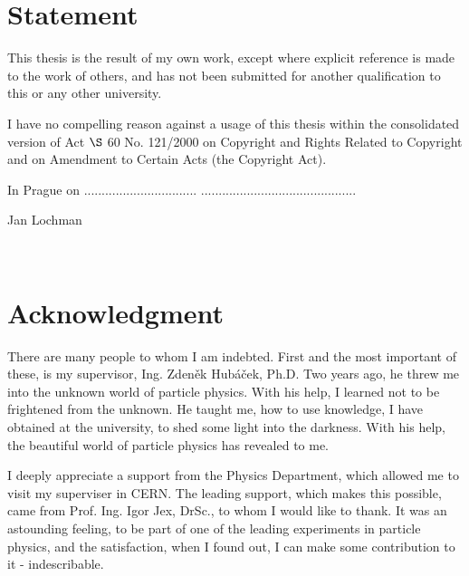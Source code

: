\documentclass[a4paper,11pt,twoside,openright]{book}
\newcommand{\autor}{Jan Lochman}
\begin{document}
\section*{Statement}

\vspace{0.5cm} 
This thesis is the result of my own work, except where explicit reference
is made to the work of others, and has not been submitted for another
qualification to this or any other university.

I have no compelling reason against a usage of this thesis within the
consolidated version of Act $\S$ 60 No. 121/2000 on Copyright and Rights Related
to Copyright and on Amendment to Certain Acts (the Copyright Act).

\vspace{5mm}In Prague on ................................\hfill 
............................................       
\begin{flushright}
  \autor 
\end{flushright}

\newpage 
\thispagestyle{empty}  
~
   
\newpage 
\thispagestyle{empty}  
\section*{Acknowledgment}

\vspace{0.5cm} 
There are many people to whom I am indebted. First and the most important of
these, is my supervisor, Ing. Zden\v{e}k Hub\'{a}\v{c}ek, Ph.D. Two years ago,
he threw me into the unknown world of particle physics. With his help, I learned
not to be frightened from the unknown. He taught me, how to use knowledge, I have
obtained at the university, to shed some light into the darkness. With his help,
the beautiful world of particle physics has revealed to me.

I deeply appreciate a support from the Physics Department, which allowed me to
visit my superviser in CERN. The leading support, which makes this possible, came from
Prof. Ing. Igor Jex, DrSc., to whom I would like to thank. It was an astounding
feeling, to be part of one of the leading experiments in particle physics, and the
satisfaction, when I found out, I can make some contribution to it -
indescribable. 
\end{document}
